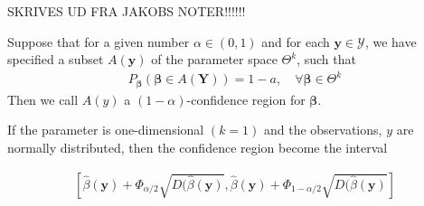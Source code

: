SKRIVES UD FRA JAKOBS NOTER!!!!!!








\begin{definition} 
\label{def:confidence_region}
Suppose that for a given number $\alpha \in (0,1)$ and for each $\textbf{y} \in \mathcal{Y}$, we have specified a subset $A(\textbf{y})$ of the parameter space $\Theta^k$, such that
\begin{align*}
    P_{\boldsymbol{\beta}} (\boldsymbol{\beta} \in A(\textbf{Y})) = 1 - a, \quad \forall \boldsymbol{\beta} \in \Theta^k
\end{align*}
Then we call $A(y)$ a $(1-\alpha)$-confidence region for $\boldsymbol{\beta}$.
\end{definition}

If the parameter is one-dimensional $(k=1)$ and the observations, $y$ are normally distributed, then the confidence region become the interval

\begin{align*}
    \left[ 
    \hat{\beta}(\textbf{y}) + \Phi_{\alpha/2} \sqrt{D(\hat{\beta}(\textbf{y})} , \hat{\beta}(\textbf{y}) + \Phi_{1 - \alpha/2} \sqrt{D(\hat{\beta}(\textbf{y})}
    \right]
\end{align*}


